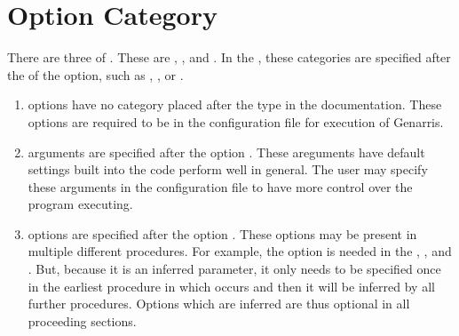 \documentclass[letterpaper,10pt,english]{sphinxmanual}
\begin{document}
\section{Option Category}
\label{\detokenize{index:option-category}}\label{\detokenize{index:category}}
There are three  of . These are ,
, and . In the , these categories
are specified after the  of the option, such as , , or .
\begin{enumerate}
\def\theenumi{\arabic{enumi}}
\def\labelenumi{\theenumi .}
\makeatletter\def\p@enumii{\p@enumi \theenumi .}\makeatother
\item {} 
 options have no category placed after the type in the
documentation. These options are required to be in the configuration
file for execution of Genarris.

\item {} 
 arguments are specified after the option .
These areguments have default settings built into the code perform
well in general. The user may specify these  arguments
in the configuration file to have more control over the program
executing.

\item {} 
 options are specified after the option . These options
may be present in multiple different procedures. For example, the option
 is needed in the ,
, and .
But, because it is an inferred parameter, it only needs to be specified
once in the earliest procedure in which occurs and then it will be
inferred by all further procedures. Options which are inferred are thus
optional in all proceeding sections.

\end{enumerate}
\end{document}
